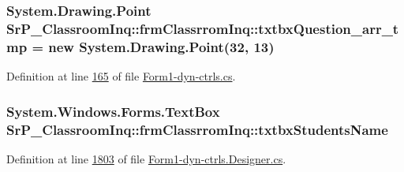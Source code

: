 \hypertarget{class_sr_p___classroom_inq_1_1frm_classrrom_inq_a09f25b6934ed463e8b781498b5511796}{
\subsubsection[{txtbx\-Question\-\_\-arr\-\_\-tmp}]{\setlength{\rightskip}{0pt plus 5cm}\-System.\-Drawing.\-Point {\bf \-Sr\-P\-\_\-\-Classroom\-Inq\-::frm\-Classrrom\-Inq\-::txtbx\-Question\-\_\-arr\-\_\-tmp} = new \-System.\-Drawing.\-Point(32, 13)}}
\label{class_sr_p___classroom_inq_1_1frm_classrrom_inq_a09f25b6934ed463e8b781498b5511796}


\-Definition at line \hyperlink{_form1-dyn-ctrls_8cs_source_l00165}{165} of file \hyperlink{_form1-dyn-ctrls_8cs_source}{\-Form1-\/dyn-\/ctrls.\-cs}.

\hypertarget{class_sr_p___classroom_inq_1_1frm_classrrom_inq_ad797f7d682d2f40b509b4904fac76461}{
\subsubsection[{txtbx\-Students\-Name}]{\setlength{\rightskip}{0pt plus 5cm}\-System.\-Windows.\-Forms.\-Text\-Box {\bf \-Sr\-P\-\_\-\-Classroom\-Inq\-::frm\-Classrrom\-Inq\-::txtbx\-Students\-Name}}}
\label{class_sr_p___classroom_inq_1_1frm_classrrom_inq_ad797f7d682d2f40b509b4904fac76461}


\-Definition at line \hyperlink{_form1-dyn-ctrls_8_designer_8cs_source_l01803}{1803} of file \hyperlink{_form1-dyn-ctrls_8_designer_8cs_source}{\-Form1-\/dyn-\/ctrls.\-Designer.\-cs}.

